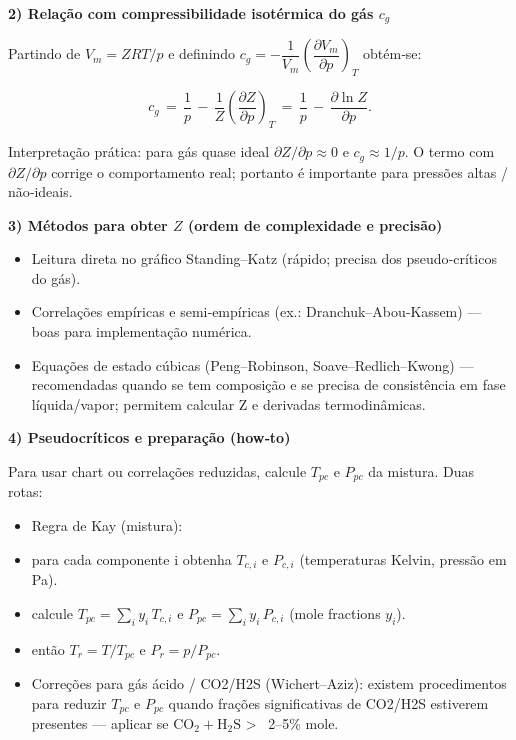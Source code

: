 \documentclass[11pt,a4paper]{article}
\begin{document}
\textbf{2) Relação com compressibilidade isotérmica do gás $c_g$}

Partindo de $V_m = Z R T / p$ e definindo $c_g = -\dfrac{1}{V_m} \left( \dfrac{\partial V_m}{\partial p} \right)_T$ obtém‑se:

$$
c_g \,=\, \frac{1}{p} \, - \, \frac{1}{Z} \left(\frac{\partial Z}{\partial p}\right)_T \,=\, \frac{1}{p} \, - \, \frac{\partial \ln Z}{\partial p} .
$$

Interpretação prática: para gás quase ideal $\partial Z/\partial p \approx 0$ e $c_g\approx 1/p$. O termo com $\partial Z/\partial p$ corrige o comportamento real; portanto é importante para pressões altas / não‑ideais.

\textbf{3) Métodos para obter $Z$ (ordem de complexidade e precisão)}

\begin{itemize}
\item Leitura direta no gráfico Standing–Katz (rápido; precisa dos pseudo‑críticos do gás).  
\item Correlações empíricas e semi‑empíricas (ex.: Dranchuk–Abou‑Kassem) — boas para implementação numérica.  
\item Equações de estado cúbicas (Peng–Robinson, Soave–Redlich–Kwong) — recomendadas quando se tem composição e se precisa de consistência em fase líquida/vapor; permitem calcular Z e derivadas termodinâmicas.
\end{itemize}

\textbf{4) Pseudocríticos e preparação (how‑to)}

Para usar chart ou correlações reduzidas, calcule $T_{pc}$ e $P_{pc}$ da mistura. Duas rotas:

\begin{itemize}
\item Regra de Kay (mistura):  
\item para cada componente i obtenha $T_{c,i}$ e $P_{c,i}$ (temperaturas Kelvin, pressão em Pa).  
\item calcule $T_{pc} = \sum_i y_i \, T_{c,i}$ e $P_{pc} = \sum_i y_i \, P_{c,i}$ (mole fractions $y_i$).  
\item então $T_r = T / T_{pc}$ e $P_r = p / P_{pc}$.  
\end{itemize}

\begin{itemize}
\item Correções para gás ácido / CO2/H2S (Wichert–Aziz): existem procedimentos para reduzir $T_{pc}$ e $P_{pc}$ quando frações significativas de CO2/H2S estiverem presentes — aplicar se $\mathrm{CO_2}+\mathrm{H_2S}$ > ~2–5\% mole.
\end{itemize}
\end{document}
